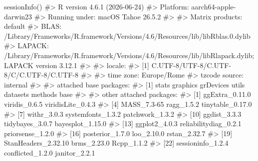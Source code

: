 \documentclass[
  italian,
  letterpaper,
  a4paper,
  11pt,
  open=any]{scrbook}
\newenvironment{Shaded}{\begin{snugshade}}{\end{snugshade}}
\newcommand{\CommentTok}[1]{\textcolor[rgb]{0.37,0.37,0.37}{#1}}
\newcommand{\FunctionTok}[1]{\textcolor[rgb]{0.28,0.35,0.67}{#1}}
\newcommand{\NormalTok}[1]{\textcolor[rgb]{0.00,0.23,0.31}{#1}}
\theoremstyle{plain}
\theoremstyle{definition}
\theoremstyle{definition}
\theoremstyle{remark}
\begin{document}
\begin{tcolorbox}[enhanced jigsaw, arc=.35mm, bottomrule=.15mm, bottomtitle=1mm, breakable, colback=white, colbacktitle=quarto-callout-note-color!10!white, colframe=quarto-callout-note-color-frame, coltitle=black, left=2mm, leftrule=.75mm, opacityback=0, opacitybacktitle=0.6, rightrule=.15mm, title=\textcolor{quarto-callout-note-color}{\faInfo}\hspace{0.5em}{Informazioni sull'ambiente di sviluppo}, titlerule=0mm, toprule=.15mm, toptitle=1mm]

\begin{Shaded}
\begin{Highlighting}[]
\FunctionTok{sessionInfo}\NormalTok{()}
\CommentTok{\#\textgreater{} R version 4.6.1 (2026{-}06{-}24)}
\CommentTok{\#\textgreater{} Platform: aarch64{-}apple{-}darwin23}
\CommentTok{\#\textgreater{} Running under: macOS Tahoe 26.5.2}
\CommentTok{\#\textgreater{} }
\CommentTok{\#\textgreater{} Matrix products: default}
\CommentTok{\#\textgreater{} BLAS:   /Library/Frameworks/R.framework/Versions/4.6/Resources/lib/libRblas.0.dylib }
\CommentTok{\#\textgreater{} LAPACK: /Library/Frameworks/R.framework/Versions/4.6/Resources/lib/libRlapack.dylib;  LAPACK version 3.12.1}
\CommentTok{\#\textgreater{} }
\CommentTok{\#\textgreater{} locale:}
\CommentTok{\#\textgreater{} [1] C.UTF{-}8/UTF{-}8/C.UTF{-}8/C/C.UTF{-}8/C.UTF{-}8}
\CommentTok{\#\textgreater{} }
\CommentTok{\#\textgreater{} time zone: Europe/Rome}
\CommentTok{\#\textgreater{} tzcode source: internal}
\CommentTok{\#\textgreater{} }
\CommentTok{\#\textgreater{} attached base packages:}
\CommentTok{\#\textgreater{} [1] stats     graphics  grDevices utils     datasets  methods   base     }
\CommentTok{\#\textgreater{} }
\CommentTok{\#\textgreater{} other attached packages:}
\CommentTok{\#\textgreater{}  [1] ggExtra\_0.11.0        viridis\_0.6.5         viridisLite\_0.4.3    }
\CommentTok{\#\textgreater{}  [4] MASS\_7.3{-}65           ragg\_1.5.2            tinytable\_0.17.0     }
\CommentTok{\#\textgreater{}  [7] withr\_3.0.3           systemfonts\_1.3.2     patchwork\_1.3.2      }
\CommentTok{\#\textgreater{} [10] ggdist\_3.3.3          tidybayes\_3.0.7       bayesplot\_1.15.0     }
\CommentTok{\#\textgreater{} [13] ggplot2\_4.0.3         reliabilitydiag\_0.2.1 priorsense\_1.2.0     }
\CommentTok{\#\textgreater{} [16] posterior\_1.7.0       loo\_2.10.0            rstan\_2.32.7         }
\CommentTok{\#\textgreater{} [19] StanHeaders\_2.32.10   brms\_2.23.0           Rcpp\_1.1.2           }
\CommentTok{\#\textgreater{} [22] sessioninfo\_1.2.4     conflicted\_1.2.0      janitor\_2.2.1        }

\end{Highlighting}
\end{Shaded}
\end{tcolorbox}
\end{document}
